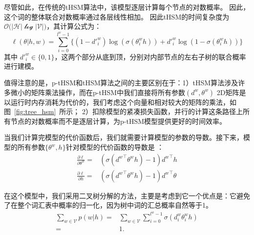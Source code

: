 尽管如此，在传统的tHSM算法中，该模型逐层计算每个节点的对数概率。 因此，这个词的整体联合对数概率通过各层线性相加。 因此tHSM的时间复杂度为$\mathcal{O(|H|\log|V|})$，其计算公式为：
\begin{equation}
\ell(\theta|h,w) =\sum_{i=0}^{l^w-1} \{(1-d'^w_i)\log (\sigma(\theta_{i}^w h))  + {d'^w_i}\log (1-\sigma (\theta_{i}^w h))\}
\end{equation}
其中 $d'^w_i\in \{0,1\}$，这两个部分从底到顶，分别对内部节点的左右子树的联合概率进行建模。

值得注意的是，p-tHSM和tHSM算法之间的主要区别在于：1）tHSM算法涉及许多微小的矩阵乘法操作，而在p-tHSM中我们直接将所有参数$(d^w,\theta^w)$ 2D矩阵是以运行时内存消耗为代价的，我们考虑这个向量和相对较大的矩阵的乘法，如图~\ref{fig:tree_hsm}~所示； 2）扣除模型的紧凑损失函数，并行的计算这条路径上所有节点的对数概率而不是逐层计算，为p-tHSM模型提供更好的时间效率。

当我们计算完模型的代价函数后，我们就需要计算模型的参数的导数。接下来，模型的所有参数$\{\theta^w,h\}$针对模型的代价函数的导数是 ：
\begin{equation}
\begin{split}
\frac{\partial \ell}{\partial \theta^w}=&(\sigma({d^w}^\top\theta^w h) -1){d^w}^\top h \\
\frac{\partial \ell}{\partial h}=&(\sigma({d^w}^\top \theta^w h) -1){d^w}^\top \theta
\end{split}
\end{equation}


在这个模型中，我们采用二叉树分解的方法，主要是考虑到它一个优点是：它避免了在整个词汇表中概率的归一化，因为树中词的汇总概率自然等于1。
\begin{equation}
\begin{split}
\sum_{w\in \mathcal{V}}{p(w|h)}=&\sum_{w \in \mathcal{V}}\sum_{i=0}^{l^w-1}{\sigma(d_i^w\theta_{i}^w h)}\\
=&1.
\end{split}
\end{equation}



